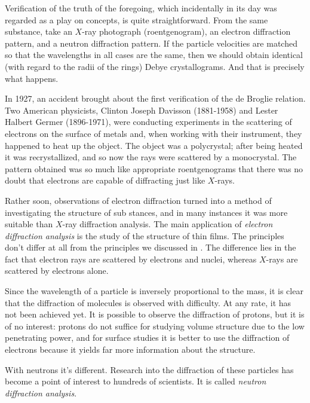 Verification of the truth of the foregoing, which inci­dentally in its day was regarded as a play on concepts, is quite straightforward. From the same substance, take an $X$-ray photograph (roentgenogram), an electron diffrac­tion pattern, and a neutron diffraction pattern. If the particle velocities are matched so that the wavelengths in all cases are the same, then we should obtain identical (with regard to the radii of the rings) Debye crystallograms. And that is precisely what happens.

In 1927, an accident brought about the first verification of the de Broglie relation. Two American physicists, Clinton Joseph Davisson (1881-1958) and Lester Halbert Germer (1896-1971), were conducting experiments in the scat­tering of electrons on the surface of metals and, when working with their instrument, they happened to heat up the object. The object was a polycrystal; after being heated it was recrystallized, and so now the rays were scattered by a monocrystal. The pattern obtained was so much like appropriate roentgenograms that there was no doubt that electrons are capable of diffracting just like $X$-rays.

Rather soon, observations of electron diffraction turned into a method of investigating the structure of sub­ stances, and in many instances it was more suitable than $X$-ray diffraction analysis. The main application of \emph{elec­tron diffraction analysis} is the study of the structure of thin films. The principles don't differ at all from the principles we discussed in . The difference lies in the fact that electron rays are scattered by electrons and nuclei, whereas $X$-rays are scattered by electrons alone.

Since the wavelength of a particle is inversely propor­tional to the mass, it is clear that the diffraction of molecules is observed with difficulty. At any rate, it has not been achieved yet. It is possible to observe the diffraction of protons, but it is of no interest: protons do not suffice for studying volume structure due to the low penetrating power, and for surface studies it is better to use the diffraction of electrons because it yields far more information about the structure.

With neutrons it's different. Research into the diffrac­tion of these particles has become a point of interest to hundreds of scientists. It is called \emph{neutron diffraction analysis}.


